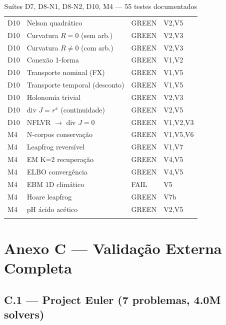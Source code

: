 \documentclass[12pt,a4paper,oneside]{article}
\begin{document}
\begin{longtable}{p{}p{}p{}p{}}
D10 & Nelson quadrático & GREEN & V2,V5 \\
D10 & Curvatura $R=0$ (sem arb.) & GREEN & V2,V3 \\
D10 & Curvatura $R\neq0$ (com arb.) & GREEN & V2,V3 \\
D10 & Conexão 1-forma & GREEN & V1,V2 \\
D10 & Transporte nominal (FX) & GREEN & V1,V5 \\
D10 & Transporte temporal (desconto) & GREEN & V1,V5 \\
D10 & Holonomia trivial & GREEN & V2,V3 \\
D10 & div $J=r^x$ (continuidade) & GREEN & V2,V5 \\
D10 & NFLVR $\to$ div $J=0$ & GREEN & V1,V2,V3 \\
\midrule
M4 & N-corpos conservação & GREEN & V1,V5,V6 \\
M4 & Leapfrog reversível & GREEN & V1,V7 \\
M4 & EM K=2 recuperação & GREEN & V4,V5 \\
M4 & ELBO convergência & GREEN & V4,V5 \\
M4 & EBM 1D climático & FAIL & V5 \\
M4 & Hoare leapfrog & GREEN & V7b \\
M4 & pH ácido acético & GREEN & V2,V5 \\
\bottomrule
\caption{Suítes D7, D8-N1, D8-N2, D10, M4 — 55 testes documentados}
\end{longtable}

\newpage

\section{Anexo C — Validação Externa Completa}

\subsection{C.1 — Project Euler (7 problemas, 4.0M solvers)}
\end{document}
